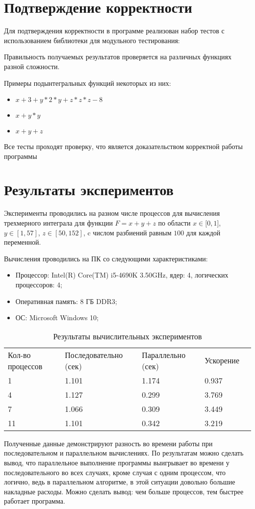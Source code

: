 \documentclass{report}
\begin{document}
\section*{Подтверждение корректности}
Для подтверждения корректности в программе реализован набор тестов с использованием библиотеки для модульного тестирования: 
\par Правильность получаемых результатов проверяется на различных функциях разной сложности.
\par Примеры подынтегральных функций некоторых из них:
\begin{itemize}
\item $x + 3 + y * 2 * y + z * z * z - 8$
\item $x + y * y$
\item $x + y + z$
\end{itemize}
\par Все тесты проходят проверку, что является доказательством корректной работы программы
\newpage

\section*{Результаты экспериментов}
Эксперименты проводились на разном числе процессов для вычисления трехмерного интеграла для функции $F = x + y + z$ по области $x\in[0,1$], $y\in[1,57]$, $z\in[50,152]$, c числом разбиений равным $100$ для каждой переменной.
\par Вычисления проводились на ПК со следующими характеристиками:
\begin{itemize}
\item Процессор: Intel(R) Core(TM) i5-4690K 3.50GHz, ядер: 4, логических процессоров: 4;
\item Оперативная память: 8 ГБ DDR3;
\item ОС: Microsoft Windows 10;
\end{itemize}
\begin{table}[!h]
\centering
\begin{tabular}{lllll}
Кол-во процессов & Последовательно (сек) & Параллельно (сек) & Ускорение  \\
1  & 1.101 & 1.174 & 0.937  \\
4  & 1.127 & 0.299 & 3.769  \\
7  & 1.066 & 0.309 & 3.449  \\
11 & 1.101 & 0.342 & 3.219  \\
\end{tabular}
\caption{Результаты вычислительных экспериментов}
\end{table}
\par Полученные данные демонстрируют разность во времени работы при последовательном и параллельном вычислениях. По результатам можно сделать вывод, что параллельное выполнение программы выигрывает во времени у последовательного во всех случаях, кроме случая с одним процессом, что логично, ведь в параллельном алгоритме, в этой ситуации довольно большие накладные расходы. Можно сделать вывод: чем больше процессов, тем быстрее работает программа.
\newpage
\end{document}
